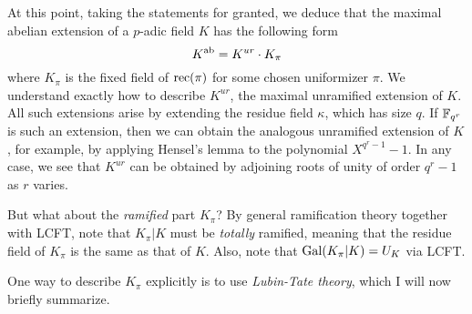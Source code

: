 At this point, taking the statements for granted, we deduce that the maximal abelian extension of a $p$-adic field $K$ has the following form
\[ K^{\mathrm{ab}} = K^{ur} \cdot K_{\pi} \]
where $K_{\pi}$ is the fixed field of $\operatorname{rec}(\pi)$ for some chosen uniformizer $\pi$.
We understand exactly how to describe $K^{ur}$, the maximal unramified extension of $K$.
All such extensions arise by extending the residue field $\kappa$, which has size $q$.
If $\mathbb{F}_{q^{r}}$ is such an extension, then we can obtain the analogous unramified extension of $K$, for example, by applying Hensel's lemma to the polynomial $X^{q^{r}-1}-1$.
In any case, we see that $K^{ur}$ can be obtained by adjoining roots of unity of order $q^{r}-1$ as $r$ varies.

But what about the \emph{ramified} part $K_{\pi}$?
By general ramification theory together with LCFT, note that $K_{\pi}|K$ must be \emph{totally} ramified, meaning that the residue field of $K_{\pi}$ is the same as that of $K$.
Also, note that $\operatorname{Gal}(K_{\pi}|K) = U_{K}$ via LCFT.

One way to describe $K_{\pi}$ explicitly is to use \emph{Lubin-Tate theory}, which I will now briefly summarize.


